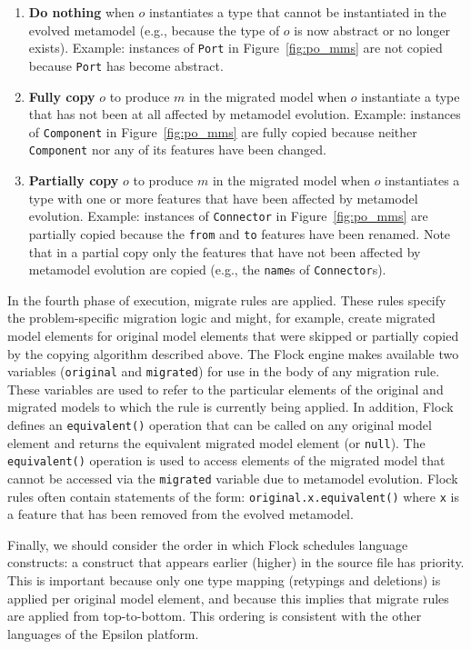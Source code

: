 \begin{enumerate}
	\item \textbf{Do nothing} when $o$ instantiates a type that cannot be instantiated in the evolved metamodel (e.g., because the type of $o$ is now abstract or no longer exists). Example: instances of \texttt{Port} in Figure~\ref{fig:po_mms} are not copied because \texttt{Port} has become abstract.
	\item \textbf{Fully copy} $o$ to produce $m$ in the migrated model when $o$ instantiate a type that has not been at all affected by metamodel evolution. Example: instances of \texttt{Component} in Figure~\ref{fig:po_mms} are fully copied because neither \texttt{Component} nor any of its features have been changed.
	\item \textbf{Partially copy} $o$ to produce $m$ in the migrated model when $o$ instantiates a type with one or more features that have been affected by metamodel evolution. Example: instances of \texttt{Connector} in Figure~\ref{fig:po_mms} are partially copied because the \texttt{from} and \texttt{to} features have been renamed. Note that in a partial copy only the features that have not been affected by metamodel evolution are copied (e.g., the \texttt{name}s of \texttt{Connector}s).
\end{enumerate}

In the fourth phase of execution, migrate rules are applied. These rules specify the problem-specific migration logic and might, for example, create migrated model elements for original model elements that were skipped or partially copied by the copying algorithm described above. The Flock engine makes available two variables (\texttt{or\-ig\-in\-al} and \texttt{mi\-gr\-at\-ed}) for use in the body of any migration rule. These variables are used to refer to the particular elements of the original and migrated models to which the rule is currently being applied. In addition, Flock defines an \texttt{equivalent()} operation that can be called on any original model element and returns the equivalent migrated model element (or \texttt{null}). The \texttt{equivalent()} operation is used to access elements of the migrated model that cannot be accessed via the \texttt{migrated} variable due to metamodel evolution. Flock rules often contain statements of the form: \texttt{original.x.equivalent()} where \texttt{x} is a feature that has been removed from the evolved metamodel.

Finally, we should consider the order in which Flock schedules language constructs: a construct that appears earlier (higher) in the source file has priority. This is important because only one type mapping (retypings and deletions) is applied per original model element, and because this implies that migrate rules are applied from top-to-bottom. This ordering is consistent with the other languages of the Epsilon platform.

